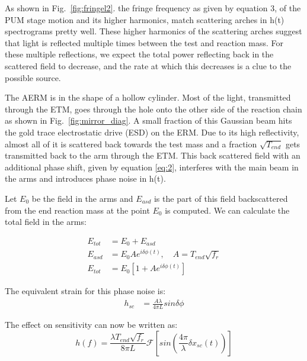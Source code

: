 \documentclass[12pt]{iopart}
\begin{document}
As shown in Fig.~\ref{fig:fringel2}. the fringe frequency as given by equation 3, of the PUM stage motion and its higher harmonics, match scattering arches in h(t) spectrograms pretty well. These higher harmonics of the scattering arches suggest that light is reflected multiple times between the test and reaction mass.  For these multiple reflections, we expect the total power reflecting back in the scattered field to decrease, and the rate at which this decreases is a clue to the possible source. 
\par
The AERM is in the shape of a hollow cylinder. Most of the light, transmitted through the ETM, goes through the hole onto the other side of the reaction chain as shown in Fig.~\ref{fig:mirror_diag}. A small fraction of this Gaussian beam hits the gold trace electrostatic drive (ESD) on the ERM. Due to its high reflectivity, almost all of it is scattered back towards the test mass and a fraction $\sqrt{T_{end}}$ gets transmitted back to the arm through the ETM. This back scattered field with an additional phase shift, given by equation \ref{eq:2}, interferes with the main beam in the arms and introduces phase noise in h(t).
\par
Let $E_{0}$ be the field in the arms and $E_{asd}$ is the part of this field backscattered from the end reaction mass at the point $E_{0}$ is computed. We can calculate the total field in the arms:

\begin{align}
    E_{tot} &= E_{0} + E_{asd} \label{eq:4} \\
    E_{asd} &= E_{0}Ae^{i{\delta}{\phi}(t)} ,\quad A = T_{end}\sqrt{f_{r}}  \label{eq:5} \\ 
    E_{tot} &= E_{0}[1 + Ae^{i{\delta}{\phi}(t)}]  \label{eq:6}
\end{align}


The equivalent strain for this phase noise is:
\begin{align}
    h_{sc} &= \frac{A{\lambda}}{4{\pi}L}sin{\delta}{\phi}  \label{eq:7}
\end{align}

The effect on sensitivity can now be written as:
\begin{equation}
    h(f) = \frac{\lambda T_{end}\sqrt{f_{r}}}{8{\pi}L}\mathcal{F}[sin(\frac{4{\pi}}{\lambda}{\delta x_{sc}(t)})]  \label{eq:8}
\end{equation}
\end{document}
